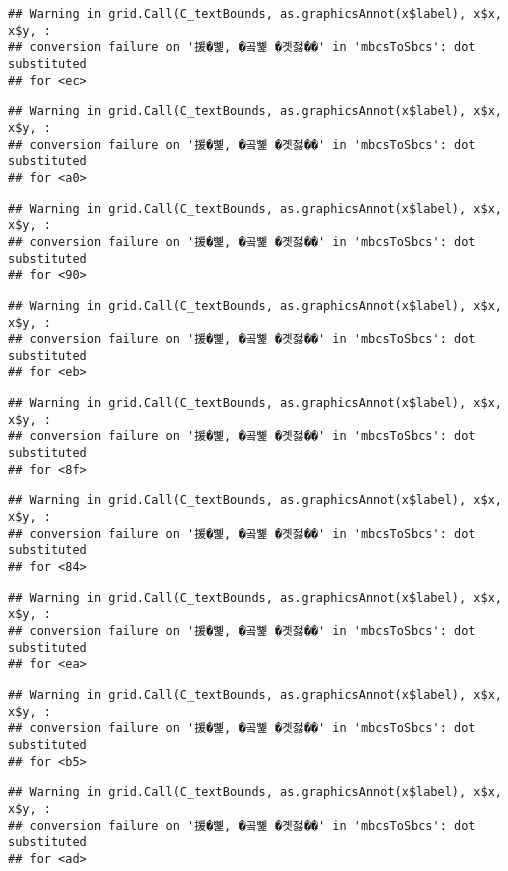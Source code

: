 \documentclass[
]{article}
\begin{document}
\begin{verbatim}
## Warning in grid.Call(C_textBounds, as.graphicsAnnot(x$label), x$x, x$y, :
## conversion failure on '援�뼱, �곸뼱 �곗젏��' in 'mbcsToSbcs': dot substituted
## for <ec>
\end{verbatim}

\begin{verbatim}
## Warning in grid.Call(C_textBounds, as.graphicsAnnot(x$label), x$x, x$y, :
## conversion failure on '援�뼱, �곸뼱 �곗젏��' in 'mbcsToSbcs': dot substituted
## for <a0>
\end{verbatim}

\begin{verbatim}
## Warning in grid.Call(C_textBounds, as.graphicsAnnot(x$label), x$x, x$y, :
## conversion failure on '援�뼱, �곸뼱 �곗젏��' in 'mbcsToSbcs': dot substituted
## for <90>
\end{verbatim}

\begin{verbatim}
## Warning in grid.Call(C_textBounds, as.graphicsAnnot(x$label), x$x, x$y, :
## conversion failure on '援�뼱, �곸뼱 �곗젏��' in 'mbcsToSbcs': dot substituted
## for <eb>
\end{verbatim}

\begin{verbatim}
## Warning in grid.Call(C_textBounds, as.graphicsAnnot(x$label), x$x, x$y, :
## conversion failure on '援�뼱, �곸뼱 �곗젏��' in 'mbcsToSbcs': dot substituted
## for <8f>
\end{verbatim}

\begin{verbatim}
## Warning in grid.Call(C_textBounds, as.graphicsAnnot(x$label), x$x, x$y, :
## conversion failure on '援�뼱, �곸뼱 �곗젏��' in 'mbcsToSbcs': dot substituted
## for <84>
\end{verbatim}

\begin{verbatim}
## Warning in grid.Call(C_textBounds, as.graphicsAnnot(x$label), x$x, x$y, :
## conversion failure on '援�뼱, �곸뼱 �곗젏��' in 'mbcsToSbcs': dot substituted
## for <ea>
\end{verbatim}

\begin{verbatim}
## Warning in grid.Call(C_textBounds, as.graphicsAnnot(x$label), x$x, x$y, :
## conversion failure on '援�뼱, �곸뼱 �곗젏��' in 'mbcsToSbcs': dot substituted
## for <b5>
\end{verbatim}

\begin{verbatim}
## Warning in grid.Call(C_textBounds, as.graphicsAnnot(x$label), x$x, x$y, :
## conversion failure on '援�뼱, �곸뼱 �곗젏��' in 'mbcsToSbcs': dot substituted
## for <ad>
\end{verbatim}
\end{document}
